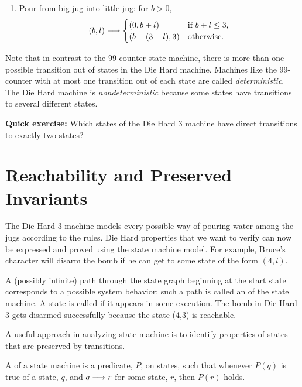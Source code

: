 \begin{example}
\begin{enumerate}
\item Pour from big jug into little jug: for $b>0$,
\begin{equation*}
(b,l) \mathrel{\longrightarrow}
\begin{cases}
(0, b+l) & \text{if $b + l \le 3$,}\\
(b - (3 -l), 3) & \text{otherwise.}
\end{cases}
\end{equation*}
\end{enumerate}


Note that in contrast to the 99-counter state machine, there is more than
one possible transition out of states in the Die Hard machine.  Machines
like the 99-counter with at most one transition out of each state are
called \emph{deterministic}.  The Die Hard machine is
\emph{nondeterministic} because some states have transitions to several
different states.

\textbf{Quick exercise:} Which states of the Die Hard 3 machine have
direct transitions to exactly two states?

\end{example}

\section{Reachability and Preserved Invariants}

The Die Hard 3 machine models every possible way of pouring water among
the jugs according to the rules.  Die Hard properties that we want to
verify can now be expressed and proved using the state machine model.  For
example, Bruce's character will disarm the bomb if he can get to some
state of the form $(4, l)$.

A (possibly infinite) path through the state graph beginning at the
start state corresponds to a possible system behavior; such a path is
called an  of the state machine.  A state is called
 if it appears in some execution.  The bomb in Die
Hard 3 gets disarmed successfully because the state (4,3) is
reachable.

A useful approach in analyzing state machine is to identify properties
of states that are preserved by transitions.

\begin{definition}
  A  of a state machine is a predicate, $P$, on
  states, such that whenever $P(q)$ is true of a state, $q$, and $q
  \mathrel{\longrightarrow} r$ for some state, $r$, then $P(r)$ holds.
\end{definition}

